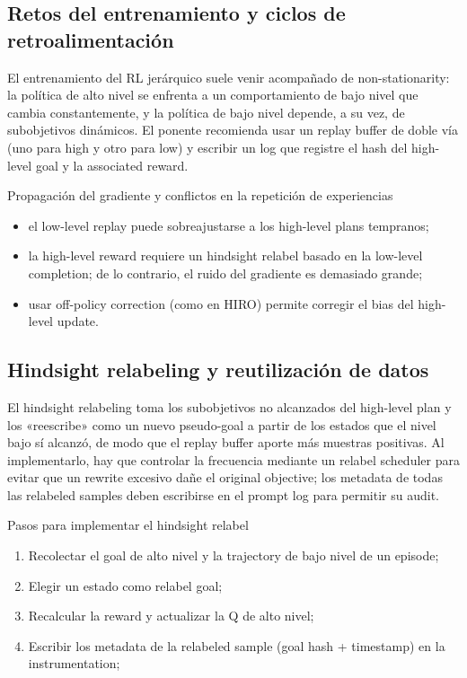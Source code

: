 \subsection{Retos del entrenamiento y ciclos de retroalimentación}

El entrenamiento del RL jerárquico suele venir acompañado de non-stationarity: la política de alto nivel se enfrenta a un comportamiento de bajo nivel que cambia constantemente, y la política de bajo nivel depende, a su vez, de subobjetivos dinámicos. El ponente recomienda usar un replay buffer de doble vía (uno para high y otro para low) y escribir un log que registre el hash del high-level goal y la associated reward.

\begin{warningbox}{Propagación del gradiente y conflictos en la repetición de experiencias}
\begin{itemize}
    \item el low-level replay puede sobreajustarse a los high-level plans tempranos;
    \item la high-level reward requiere un hindsight relabel basado en la low-level completion; de lo contrario, el ruido del gradiente es demasiado grande;
    \item usar off-policy correction (como en HIRO) permite corregir el bias del high-level update.
\end{itemize}
\end{warningbox}

\subsection{Hindsight relabeling y reutilización de datos}

El hindsight relabeling toma los subobjetivos no alcanzados del high-level plan y los «reescribe» como un nuevo pseudo-goal a partir de los estados que el nivel bajo sí alcanzó, de modo que el replay buffer aporte más muestras positivas. Al implementarlo, hay que controlar la frecuencia mediante un relabel scheduler para evitar que un rewrite excesivo dañe el original objective; los metadata de todas las relabeled samples deben escribirse en el prompt log para permitir su audit.

\begin{importantbox}{Pasos para implementar el hindsight relabel}
\begin{enumerate}
    \item Recolectar el goal de alto nivel y la trajectory de bajo nivel de un episode;
    \item Elegir un estado como relabel goal;
    \item Recalcular la reward y actualizar la Q de alto nivel;
    \item Escribir los metadata de la relabeled sample (goal hash + timestamp) en la instrumentation;
\end{enumerate}
\end{importantbox}

